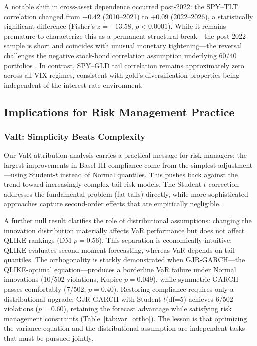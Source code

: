 A notable shift in cross-asset dependence occurred post-2022: the SPY--TLT correlation changed from $-0.42$ (2010--2021) to $+0.09$ (2022--2026), a statistically significant difference (Fisher's $z = -13.58$, $p < 0.0001$). While it remains premature to characterize this as a permanent structural break---the post-2022 sample is short and coincides with unusual monetary tightening---the reversal challenges the negative stock-bond correlation assumption underlying 60/40 portfolios \citep[cf.][]{campbell2017}. In contrast, SPY--GLD tail correlation remains approximately zero across all VIX regimes, consistent with gold's diversification properties being independent of the interest rate environment.

\subsection{Implications for Risk Management Practice}

\subsubsection{VaR: Simplicity Beats Complexity}

Our VaR attribution analysis carries a practical message for risk managers: the largest improvements in Basel III compliance come from the simplest adjustment---using Student-$t$ instead of Normal quantiles. This pushes back against the trend toward increasingly complex tail-risk models. The Student-$t$ correction addresses the fundamental problem (fat tails) directly, while more sophisticated approaches capture second-order effects that are empirically negligible.

A further null result clarifies the role of distributional assumptions: changing the innovation distribution materially affects VaR performance but does not affect QLIKE rankings (DM $p = 0.56$). This separation is economically intuitive: QLIKE evaluates second-moment forecasting, whereas VaR depends on tail quantiles. The orthogonality is starkly demonstrated when GJR-GARCH---the QLIKE-optimal equation---produces a borderline VaR failure under Normal innovations (10/502 violations, Kupiec $p = 0.049$), while symmetric GARCH passes comfortably (7/502, $p = 0.40$). Restoring compliance requires only a distributional upgrade: GJR-GARCH with Student-$t$(df=5) achieves 6/502 violations ($p = 0.60$), retaining the forecast advantage while satisfying risk management constraints (Table~\ref{tab:var_ortho}). The lesson is that optimizing the variance equation and the distributional assumption are independent tasks that must be pursued jointly.

